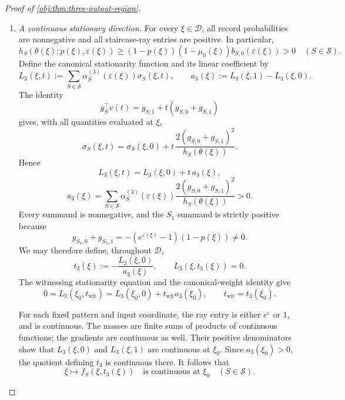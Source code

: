 \documentclass[11pt]{article}
\begin{document}
\begin{proof}[Proof of \cref{obj:thm:three-output-region}]
\begin{enumerate}
\item \textit{A continuous stationary direction.}
For every \(\xi\in\mathcal D\), all record probabilities are nonnegative and all staircase-ray entries are positive. In particular,
\[
h_S(\theta(\xi);p(\xi),\varepsilon(\xi))
\ge
(1-p(\xi))(1-\mu_0(\xi))b_{S,0}(\varepsilon(\xi))
>0
\quad(S\in\mathcal S).
\]
Define the canonical stationarity function and its linear coefficient by
\[
L_3(\xi,t):=
\sum_{S\in\mathcal S}
\alpha^{(3)}_S(\varepsilon(\xi))\sigma_S(\xi,t),
\qquad
a_3(\xi):=L_3(\xi,1)-L_3(\xi,0).
\]
The identity
\[
g_S^\top v(t)=g_{S,1}+t(g_{S,0}+g_{S,1})
\]
gives, with all quantities evaluated at \(\xi\),
\[
\sigma_S(\xi,t)
=
\sigma_S(\xi,0)
+
t\,\frac{2(g_{S,0}+g_{S,1})^2}{h_S(\theta(\xi))}.
\]
Hence
\[
L_3(\xi,t)=L_3(\xi,0)+t\,a_3(\xi),
\]
\[
a_3(\xi)=
\sum_{S\in\mathcal S}
\alpha^{(3)}_S(\varepsilon(\xi))
\frac{2(g_{S,0}+g_{S,1})^2}{h_S(\theta(\xi))}>0.
\]
Every summand is nonnegative, and the \(S_1\) summand is strictly positive because
\[
g_{S_1,0}+g_{S_1,1}
=-(e^{\varepsilon(\xi)}-1)(1-p(\xi))\ne0.
\]
We may therefore define, throughout \(\mathcal D\),
\[
t_3(\xi):=-\frac{L_3(\xi,0)}{a_3(\xi)},
\qquad
L_3(\xi,t_3(\xi))=0.
\]
The witnessing stationarity equation and the canonical-weight identity give
\[
0=L_3(\xi_0,t_{\mathrm{wit}})
=L_3(\xi_0,0)+t_{\mathrm{wit}}a_3(\xi_0),
\qquad
t_{\mathrm{wit}}=t_3(\xi_0).
\]

For each fixed pattern and input coordinate, the ray entry is either \(e^\varepsilon\) or \(1\), and is continuous. The masses are finite sums of products of continuous functions; the gradients are continuous as well. Their positive denominators show that \(L_3(\xi,0)\) and \(L_3(\xi,1)\) are continuous at \(\xi_0\). Since \(a_3(\xi_0)>0\), the quotient defining \(t_3\) is continuous there. It follows that
\[
\xi\longmapsto f_S(\xi,t_3(\xi))
\quad\text{is continuous at }\xi_0
\quad(S\in\mathcal S).
\]


\end{enumerate}
\end{proof}
\end{document}
